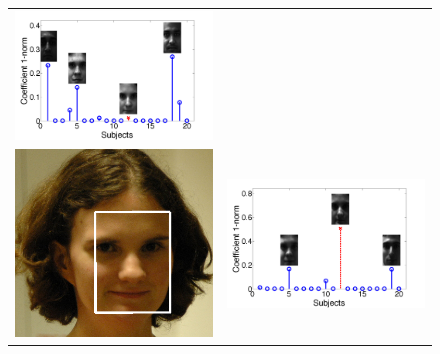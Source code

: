 \begin{figure}
\begin{tabular}{cc}
\hspace{3mm}
\includegraphics[height=\tempheight]{figures_pami/promo/case2/sci_with_axis_face_case2.png}
\\ \includegraphics[height=\tempheight]{figures_pami/promo/case3/alignment.png} &
\hspace{3mm}
\includegraphics[height=\tempheight]{figures_pami/promo/case3/sci_with_axis_face_case3.png}

\end{tabular}
\end{figure}

